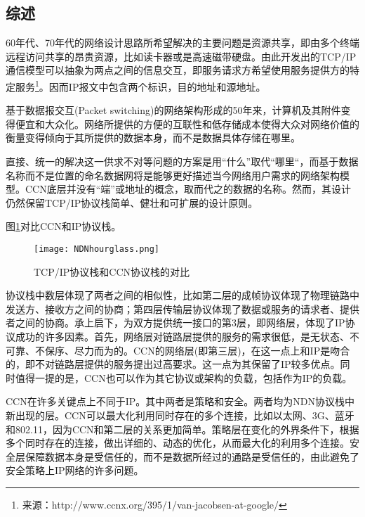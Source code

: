 \subsection*{综述}
\par
60年代、70年代的网络设计思路所希望解决的主要问题是资源共享，即由多个终端远程访问共享的昂贵资源，比如读卡器或是高速磁带硬盘。由此开发出的TCP/IP通信模型可以抽象为两点之间的信息交互，即服务请求方希望使用服务提供方的特定服务\footnote{来源：http://www.ccnx.org/395/1/van-jacobsen-at-google/}。因而IP报文中包含两个标识，目的地址和源地址。
\par
基于数据报交互(Packet switching)的网络架构形成的50年来，计算机及其附件变得便宜和大众化。网络所提供的方便的互联性和低存储成本使得大众对网络价值的衡量变得倾向于其所提供的数据本身，而不是数据具体存储在哪里。
\par
直接、统一的解决这一供求不对等问题的方案是用“什么”取代“哪里“，而基于数据名称而不是位置的命名数据网将是能够更好描述当今网络用户需求的网络架构模型。CCN底层并没有“端”或地址的概念，取而代之的数据的名称。然而，其设计仍然保留TCP/IP协议栈简单、健壮和可扩展的设计原则。
\par
图\ref{fig:ProtocolStacks}对比CCN和IP协议栈。
\begin{figure}[h!]
	\centering
	\texttt{[image: NDNhourglass.png]}
	\caption{TCP/IP协议栈和CCN协议栈的对比}
	\label{fig:ProtocolStacks}
\end{figure}
\par
协议栈中数层体现了两者之间的相似性，比如第二层的成帧协议体现了物理链路中发送方、接收方之间的协商；第四层传输层协议体现了数据或服务的请求者、提供者之间的协商。承上启下，为双方提供统一接口的第3层，即网络层，体现了IP协议成功的许多因素。首先，网络层对链路层提供的服务的需求很低，是无状态、不可靠、不保序、尽力而为的。CCN的网络层(即第三层)，在这一点上和IP是吻合的，即不对链路层提供的服务提出过高要求。这一点为其保留了IP较多优点。同时值得一提的是，CCN也可以作为其它协议或架构的负载，包括作为IP的负载。
\par
CCN在许多关键点上不同于IP。其中两者是策略和安全。两者均为NDN协议栈中新出现的层。CCN可以最大化利用同时存在的多个连接，比如以太网、3G、蓝牙和802.11，因为CCN和第二层的关系更加简单。策略层在变化的外界条件下，根据多个同时存在的连接，做出详细的、动态的优化，从而最大化的利用多个连接。安全层保障数据本身是受信任的，而不是数据所经过的通路是受信任的，由此避免了安全策略上IP网络的许多问题。

